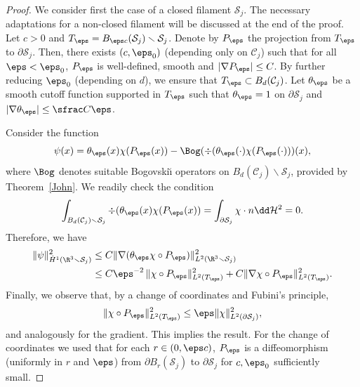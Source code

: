\begin{proof}
We consider first the case of a closed filament $\mathcal S_j$. The necessary adaptations for a non-closed filament will be discussed at the end of the proof.
Let $c>0$ and $T_\eps = B_{\eps c}(\mathcal S_j) \smallsetminus \mathcal S_j$.
Denote by $P_\eps$ the projection from $T_\eps$ to $\partial\mathcal S_j$. Then, there exists $(c,\eps_0)$ (depending only on $\mathcal C_j$) such that for all $\eps < \eps_0$, $P_\eps$ is well-defined, smooth and $|\nabla P_\eps| \leq C$. By further reducing $\eps_0$ (depending on $d$), we ensure that $T_\eps \subset B_d(\mathcal C_j)$.
Let $\theta_\eps$ be a smooth cutoff function supported in $T_\eps$ such that $\theta_\eps = 1$ on $\partial \mathcal S_j$ and
$|\nabla \theta_\eps| \leq \sfrac C \eps$.

Consider the function
\begin{equation}
\psi(x) = \theta_\eps(x) \chi(P_\eps (x)) - \Bog(\div(\theta_\eps(\cdot) \chi(P_\eps(\cdot)))(x),
\end{equation}
where $\Bog$ denotes suitable Bogovski\u{\i} operators on $B_d(\mathcal C_j) \smallsetminus \mathcal S_{j}$, provided by Theorem~\ref{John}.
We readily check the condition
\begin{equation}
\int_{B_d(\mathcal C_j) \smallsetminus \mathcal S_j}
\div(\theta_\eps(x) \chi(P_\eps(x)) = \int_{\partial\mathcal S_j} \chi \cdot n \dd \mathcal{H}^2 = 0.
\end{equation}
Therefore, we have
\begin{align}
\| \psi\|_{\dot H^1(\R^3 \smallsetminus \mathcal S_j)}^2
&\leq C \| \nabla (\theta_\eps \chi \circ P_\eps) \|_{L^2(\R^3 \smallsetminus \mathcal S_j)}^2 \\
&\leq C {\eps^{-2}\, } \|\chi \circ P_\eps\|_{L^2(T_\eps)}^2 + C \|\nabla \chi \circ P_\eps\|_{L^2(T_\eps)}^2.
\end{align}
Finally, we observe that, by a change of coordinates and Fubini's principle,
\begin{equation}
\|\chi \circ P_\eps\|_{L^2(T_\eps)}^2 \leq \eps \|\chi \|_{L^2(\partial\mathcal S_j)}^2,
\end{equation}
and analogously for the gradient. This implies the result.
For the change of coordinates we used that for each $r \in (0, \eps c)$, $P_\eps$ is a diffeomorphism (uniformly in $r$ and $\eps$) from $\partial B_r(\mathcal S_j)$ to $\partial \mathcal S_j$ for $c, \eps_0$ sufficiently small.


\end{proof}
